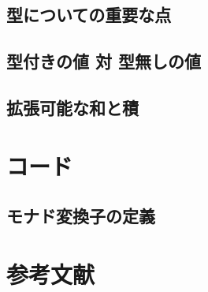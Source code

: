 \documentclass[11pt, oneside]{jsbook}   	%
\begin{document}
\section{ 型についての重要な点 }
\section{ 型付きの値 対 型無しの値 }
\section{ 拡張可能な和と積 }


\newpage
\chapter{コード}
\section{ モナド変換子の定義 }
\newpage

\newpage

\newpage

\newpage

\newpage

\newpage

\newpage

\newpage

\newpage



\chapter{参考文献}
\end{document}
